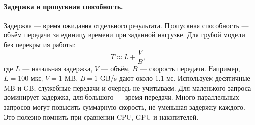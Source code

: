 \paragraph{Задержка и пропускная способность.}
Задержка --- время ожидания отдельного результата. Пропускная способность
--- объём передачи за единицу времени при заданной нагрузке.
Для грубой модели без перекрытия работы:
\[
T\approx L+\frac{V}{B},
\]
где $L$ --- начальная задержка, $V$ --- объём, $B$ --- скорость передачи.
Например, $L=100$ мкс, $V=1$ MB, $B=1$ GB/s дают около 1.1 мс.
Используем десятичные MB и GB; служебные передачи и очередь не учитываем.
Для маленького запроса доминирует задержка, для большого --- время передачи.
Много параллельных запросов могут повысить суммарную скорость, не уменьшая
задержку каждого. Это полезно помнить при сравнении CPU, GPU и накопителей.
